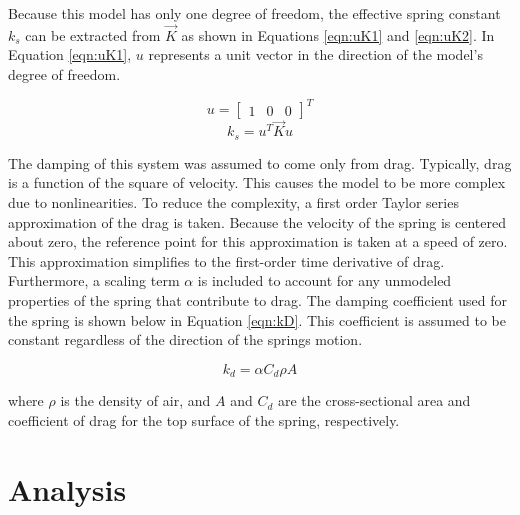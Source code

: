 \documentclass[conference]{article}
\begin{document}
Because this model has only one degree of freedom, the effective spring constant $k_s$ can be extracted from $\vec{K}$ as shown in Equations \ref{eqn:uK1} and \ref{eqn:uK2}. In Equation \ref{eqn:uK1}, $u$ represents a unit vector in the direction of the model's degree of freedom.

\begin{equation}
	u = \begin{bmatrix}
	1 & 0 & 0
	\end{bmatrix}^T 
	\label{eqn:uK1}
\end{equation}
\begin{equation}
	k_s = u^T \vec{K} u
	\label{eqn:uK2}
\end{equation}

The damping of this system was assumed to come only from drag. Typically, drag is a function of the square of velocity. This causes the model to be more complex due to nonlinearities. To reduce the complexity, a first order Taylor series approximation of the drag is taken. Because the velocity of the spring is centered about zero, the reference point for this approximation is taken at a speed of zero. This approximation simplifies to the first-order time derivative of drag.  Furthermore, a scaling term $\alpha$ is included to account for any unmodeled properties of the spring that contribute to drag. The damping coefficient used for the spring is shown below in Equation \ref{eqn:kD}. This coefficient is assumed to be constant regardless of the direction of the springs motion.

\begin{equation}
	k_d = \alpha C_d \rho A
\label{eqn:kD}
\end{equation}

where $\rho$ is the density of air, and $A$ and $C_d$ are the cross-sectional area and coefficient of drag for the top surface of the spring, respectively.


\section{Analysis}
\end{document}

